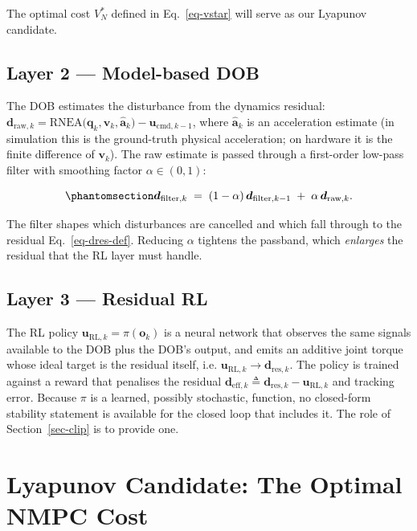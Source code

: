 \documentclass[
  11pt,
]{article}
\theoremstyle{plain}
\theoremstyle{plain}
\theoremstyle{definition}
\theoremstyle{remark}
\begin{document}
The optimal cost \(V_N^*\) defined in Eq.~\ref{eq-vstar} will serve as
our Lyapunov candidate.

\subsection{Layer 2 --- Model-based DOB}\label{sec-dob}

The DOB estimates the disturbance from the dynamics residual:
\(\bm{d}_{\mathrm{raw},k} = \mathrm{RNEA}\bigl(\bm{q}_k,\bm{v}_k,
\hat{\bm{a}}_k\bigr) - \bm{u}_{\mathrm{cmd},k-1}\), where
\(\hat{\bm{a}}_k\) is an acceleration estimate (in simulation this is
the ground-truth physical acceleration; on hardware it is the finite
difference of \(\bm{v}_k\)). The raw estimate is passed through a
first-order low-pass filter with smoothing factor \(\alpha \in (0,1)\):

\begin{equation}\protect\phantomsection\label{eq-dob-lpf}{
\bm{d}_{\mathrm{filter},k}
\;=\; (1-\alpha)\,\bm{d}_{\mathrm{filter},k-1}
\;+\; \alpha\,\bm{d}_{\mathrm{raw},k}.
}\end{equation}

The filter shapes which disturbances are cancelled and which fall
through to the residual Eq.~\ref{eq-dres-def}. Reducing \(\alpha\)
tightens the passband, which \emph{enlarges} the residual that the RL
layer must handle.

\subsection{Layer 3 --- Residual RL}\label{sec-rl}

The RL policy \(\bm{u}_{\mathrm{RL},k} = \pi(\bm{o}_k)\) is a neural
network that observes the same signals available to the DOB plus the
DOB's output, and emits an additive joint torque whose ideal target is
the residual itself, i.e.
\(\bm{u}_{\mathrm{RL},k} \to \bm{d}_{\mathrm{res},k}\). The policy is
trained against a reward that penalises the residual
\(\bm{d}_{\mathrm{eff},k} \triangleq \bm{d}_{\mathrm{res},k} -
\bm{u}_{\mathrm{RL},k}\) and tracking error. Because \(\pi\) is a
learned, possibly stochastic, function, no closed-form stability
statement is available for the closed loop that includes it. The role of
Section~\ref{sec-clip} is to provide one.

\section{Lyapunov Candidate: The Optimal NMPC Cost}\label{sec-lyap}
\end{document}
